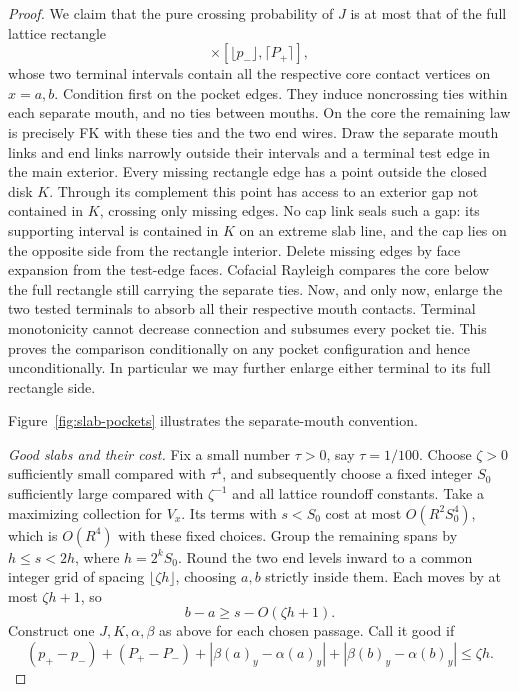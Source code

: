 \begin{proof}
We claim that the pure crossing probability of $J$ is at most that of
the full lattice rectangle
\begin{equation}
 [a,b]\times[\lfloor p_-\rfloor,\lceil P_+\rceil],
 \label{rect:comparison-box}
\end{equation}
whose two terminal intervals contain all the respective core contact
vertices on $x=a,b$.  Condition first on the pocket edges.  They induce
noncrossing ties within each separate mouth, and no ties between mouths.
On the core the remaining law is precisely FK with these ties and the
two end wires.  Draw the separate mouth links and end links narrowly
outside their intervals and a terminal test edge in the main exterior.
Every missing rectangle edge has a point outside the closed disk $K$.
Through its complement this point has access to an exterior gap not
contained in $K$, crossing only missing edges.  No cap link seals such
a gap: its supporting interval is contained in $K$ on an extreme slab
line, and the cap lies on the opposite side from the rectangle interior.
Delete missing edges by face expansion from the test-edge faces.
Cofacial Rayleigh compares the core below the full rectangle still
carrying the separate ties.  Now, and only now, enlarge the two tested
terminals to absorb all their respective mouth contacts.  Terminal
monotonicity cannot decrease connection and subsumes every pocket tie.  This
proves the comparison conditionally on any pocket configuration and
hence unconditionally.  In particular we may further enlarge either
terminal to its full rectangle side.

Figure~\ref{fig:slab-pockets} illustrates the separate-mouth convention.


\smallskip\noindent
\emph{Good slabs and their cost.}
Fix a small number $\tau>0$, say $\tau=1/100$.  Choose $\zeta>0$
sufficiently small compared with $\tau^4$, and subsequently choose a
fixed integer $S_0$ sufficiently large compared with $\zeta^{-1}$ and
all lattice roundoff constants.  Take a maximizing collection for
$V_x$.  Its terms with $s<S_0$ cost at most $O(R^2S_0^4)$, which is
$O(R^4)$ with these fixed choices.  Group the remaining spans by
$h\le s<2h$, where $h=2^kS_0$.  Round the two end levels inward to a
common integer grid of spacing $\lfloor\zeta h\rfloor$, choosing
$a,b$ strictly inside them.  Each moves by at most $\zeta h+1$, so
\[
 b-a\ge s-O(\zeta h+1).
\]
Construct one $J,K,\alpha,\beta$ as above for each chosen passage.
Call it good if
\begin{equation}
 (p_+-p_-)+(P_+-P_-)
 +|\beta(a)_y-\alpha(a)_y|
 +|\beta(b)_y-\alpha(b)_y|\le\zeta h.
 \label{rect:good-slab}
\end{equation}


\end{proof}
